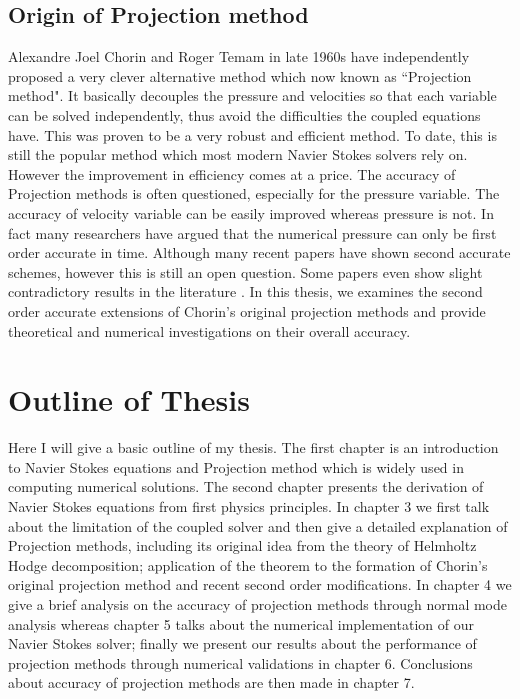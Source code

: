\subsection{Origin of Projection method}
Alexandre Joel Chorin and Roger Temam in late 1960s have independently proposed a very clever alternative method which now known as ``Projection method". It basically decouples the pressure and velocities so that each variable can be solved independently, thus avoid the difficulties the coupled equations have. This was proven to be a very robust and efficient method. To date, this is still the popular method which most modern Navier Stokes solvers rely on. However the improvement in efficiency comes at a price. The accuracy of Projection methods is often questioned, especially for the pressure variable. The accuracy of velocity variable can be easily improved whereas pressure is not. In fact many researchers have argued that the numerical pressure can only be first order accurate in time. Although many recent papers have shown second accurate schemes, however this is still an open question. Some papers even show slight contradictory results in the literature \cite{brown2001accurate, pyo2005normal,guermond2004error,guermond2006overview}. In this thesis, we examines the second order accurate extensions of Chorin's original projection methods and provide theoretical and numerical investigations on their overall accuracy.

\section{Outline of Thesis}
Here I will give a basic outline of my thesis. The first chapter is an introduction to Navier Stokes equations and Projection method which is widely used in computing numerical solutions. The second chapter presents the derivation of Navier Stokes equations from first physics principles. In chapter 3 we first talk about the limitation of the coupled solver and then give a detailed explanation of Projection methods, including its original idea from the theory of Helmholtz Hodge decomposition; application of the theorem to the formation of Chorin's original projection method and recent second order modifications. In chapter 4 we give a brief analysis on the accuracy of projection methods through normal mode analysis whereas chapter 5 talks about the numerical implementation of our Navier Stokes solver; finally we present our results about the performance of projection methods through numerical validations in chapter 6. Conclusions about accuracy of projection methods are then made in chapter 7.
